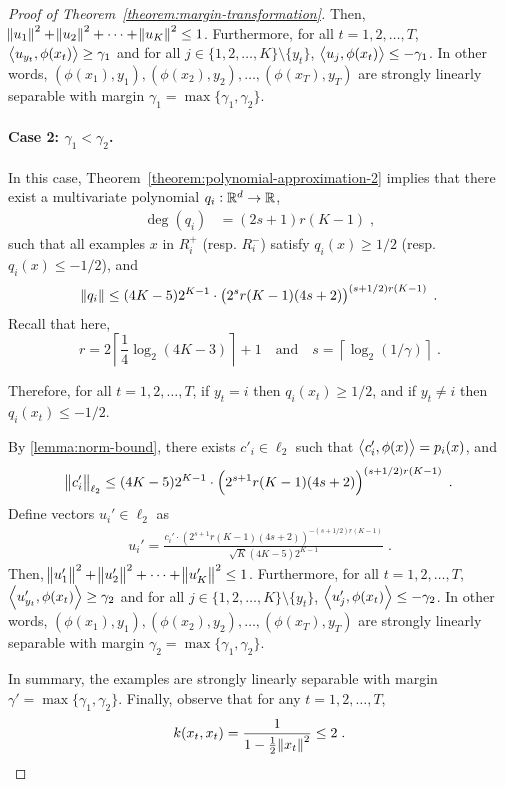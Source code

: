 \begin{proof}[Proof of Theorem~\ref{theorem:margin-transformation}]
Then, $\norm{u_1}^2 + \norm{u_2}^2 + \dots + \norm{u_K}^2 \le 1$.
Furthermore, for all $t=1,2,\dots,T$, $\left\langle u_{y_t}, \phi(x_t) \right\rangle \ge \gamma_1$
and for all $j \in \{1,2,\dots,K\} \setminus \{y_t\}$,
$\left\langle u_j, \phi(x_t) \right\rangle \le - \gamma_1$. In other words,
$(\phi(x_1), y_1), (\phi(x_2), y_2), \dots, (\phi(x_T), y_T)$ are
strongly linearly separable with margin $\gamma_1 = \max\{\gamma_1, \gamma_2\}$.

\paragraph{Case 2: $\gamma_1 < \gamma_2$.} In this case, Theorem~\ref{theorem:polynomial-approximation-2}
implies that there exist a multivariate polynomial $q_i:\mathbb{R}^d \to \mathbb{R}$,
\begin{align*}
\deg(q_i) & = (2s+1) r(K-1) \; ,
\end{align*}
such that all examples $x$ in $R_i^+$ (resp. $R_i^-$) satisfy $q_i(x) \geq 1/2$
(resp. $q_i(x) \leq -1/2$), and
\begin{align*}
  \norm{q_i} \le (4K-5) 2^{K-1} \cdot \left(2^{s} r(K-1) (4s+2)\right)^{(s+1/2)r(K-1)} \; .
\end{align*}
Recall that here,
\[
r = 2 \left\lceil \frac{1}{4} \log_2(4K - 3) \right\rceil + 1 \quad \text{and} \quad s = \left \lceil \log_2(1/\gamma) \right \rceil \; .
\]

Therefore, for all $t=1,2,\dots,T$, if $y_t = i$ then $q_i(x_t) \ge 1/2$,
 and if $y_t \neq i$ then $q_i(x_t) \le -1/2$.

By \autoref{lemma:norm-bound}, there exists $c'_i \in \ell_2$ such that
$\left\langle c'_i, \phi(x) \right\rangle = p_i(x)$, and
\[
  \norm{c'_i}_{\ell_2} \le (4K-5) 2^{K-1} \cdot \left(2^{s+1} r(K-1) (4s+2) \right)^{(s+1/2)r(K-1)} \; .
\]
Define vectors $u_i' \in \ell_2$ as
\begin{align*}
u_i' = \frac{c_i'  \cdot \left(2^{s+1} r(K-1) (4s+2) \right)^{-(s+1/2)r(K-1)}}{\sqrt{K} (4K-5) 2^{K-1}} \; .
\end{align*}
Then,
$\norm{u_1'}^2 + \norm{u_2'}^2 + \dots + \norm{u_K'}^2 \le 1$.
Furthermore, for all $t=1,2,\dots,T$,
$\left\langle u'_{y_t}, \phi(x_t) \right\rangle \ge \gamma_2$
and for all $j \in \{1,2,\dots,K\} \setminus \{y_t\}$,
$\left\langle u'_j, \phi(x_t) \right\rangle \le - \gamma_2$. In other words,
$(\phi(x_1), y_1), (\phi(x_2), y_2), \dots, (\phi(x_T), y_T)$ are
strongly linearly separable with margin $\gamma_2 = \max\{\gamma_1, \gamma_2\}$.

In summary, the examples are strongly
linearly separable with margin $\gamma' = \max\{\gamma_1, \gamma_2\}$.
Finally, observe that for any $t=1,2,\dots,T$,
\[
k(x_t,x_t) = \frac{1}{1 - \frac{1}{2} \norm{x_t}^2} \le 2 \; .
\qedhere
\]
\end{proof}
